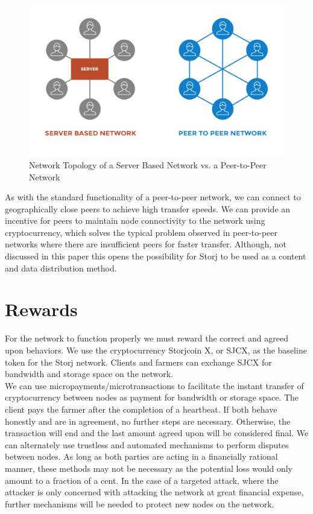 \documentclass[a4paper,10pt]{article}
\begin{document}
\begin{figure}[h!]
\centering
\includegraphics[width=\linewidth]{7}
\caption{Network Topology of a Server Based Network vs. a Peer-to-Peer Network}
\end{figure}

As with the standard functionality of a peer-to-peer network, we can connect to geographically close peers to achieve high transfer speeds. We can provide an incentive for peers to maintain node connectivity to the network using cryptocurrency, which solves the typical problem observed in peer-to-peer networks where there are insufficient peers for faster transfer. Although, not discussed in this paper this opens the possibility for Storj to be used as a content and data distribution method. 

\section{Rewards}
For the network to function properly we must reward the correct and agreed upon behaviors. We use the cryptocurrency Storjcoin X, or SJCX, as the baseline token for the Storj network. Clients and farmers can exchange SJCX for bandwidth and storage space on the network. \\

We can use micropayments/microtransactions \cite{12} \cite{13} to facilitate the instant transfer of cryptocurrency between nodes as payment for bandwidth or storage space. The client pays the farmer after the completion of a heartbeat. If both behave honestly and are in agreement, no further steps are necessary. Otherwise, the transaction will end and the last amount agreed upon will be considered final. We can alternately use trustless and automated mechanisms to perform disputes between nodes. As long as both parties are acting in a financially rational manner, these methods may not be necessary as the potential loss would only amount to a fraction of a cent. In the case of a targeted attack, where the attacker is only concerned with attacking the network at great financial expense, further mechanisms will be needed to protect new nodes on the network. \\
\end{document}
